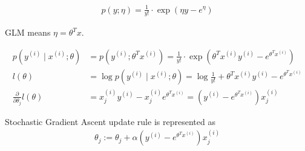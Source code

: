 \begin{answer}
\begin{align*}
    p(y;\eta) = \frac{1}{y!}\cdot\exp(\eta y - e^\eta)
\end{align*}

GLM means $\eta = \theta^T x$.

\begin{align*}
    p(y^{(i)}\mid x^{(i)};\theta) &= p(y^{(i)}; \theta^T x^{(i)}) = \frac{1}{y!}\cdot\exp(\theta^T x^{(i)} y^{(i)} - e^{\theta^T x^{(i)}}) \\
    l(\theta) &= \log{p(y^{(i)}\mid x^{(i)};\theta)} = \log{\frac{1}{y!}} + \theta^T x^{(i)} y^{(i)} - e^{\theta^T x^{(i)}} \\
    \frac{\partial}{\partial\theta_j} l(\theta) &= x^{(i)}_j y^{(i)} - x^{(i)}_j e^{\theta^T x^{(i)}} = (y^{(i)} - e^{\theta^T x^{(i)}})x^{(i)}_j 
\end{align*}

Stochastic Gradient Ascent update rule is represented as
\begin{align*}
    \theta_j := \theta_j + \alpha(y^{(i)} - e^{\theta^T x^{(i)}})x^{(i)}_j 
\end{align*}

\end{answer}
